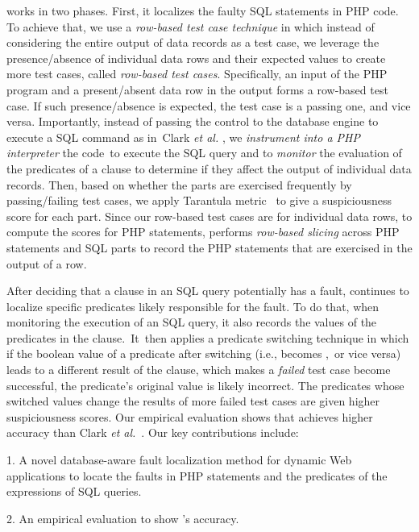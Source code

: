 {\tool} works in two phases. First, it localizes the faulty SQL
statements in PHP code. To achieve that, we use a {\em row-based test
case technique} in which instead of considering the entire output of
data records as a test case, we leverage the presence/absence of
individual data rows and their expected values to create more test cases,
called {\em row-based test cases}. Specifically, an input of the PHP
program and a present/absent data row in the output forms a row-based
test case. If such presence/absence is expected, the test case is a
passing one, and vice versa. Importantly, instead of passing the
control to the database engine to execute a SQL command as in~Clark
{\em et al.} \cite{ga-ase11}, we {\em instrument into a PHP
interpreter} the code~to execute the SQL query and to {\em monitor}
the evaluation of the predicates of a  clause to determine
if they affect the output of individual data records. Then,
based on whether the  parts are exercised frequently
by passing/failing test cases, we apply Tarantula
metric~\cite{tarantula05} to give a suspiciousness score for each
 part. Since our row-based test cases are for individual
data rows, to compute the scores for PHP statements, {\tool} performs
{\em row-based slicing} across PHP statements and SQL parts to record
the PHP statements that are exercised in the output of a 
row.

After deciding that a  clause in an SQL query potentially
has a fault, {\tool} continues to localize specific predicates likely
responsible for the fault. To do that, when monitoring 
the execution of an SQL query, it also records the values of the
predicates in the  clause.~It~then applies a predicate
switching technique in which if the boolean value of a predicate after
switching (i.e.,  becomes ,~or vice versa)
leads to a different result of the  clause, which makes a
\emph{failed} test case become successful, the predicate's original
value is likely incorrect. The predicates whose switched values
change the results of more failed test cases are given higher
suspiciousness scores. Our empirical evaluation 
shows that {\tool} achieves higher accuracy than Clark {\em et
al.}~\cite{ga-ase11}.
Our key contributions include:

1. A novel database-aware fault localization method for dynamic
Web applications to locate the faults in PHP statements and the
predicates of the  expressions of SQL queries.


2. An empirical evaluation to show {\tool}'s accuracy.




